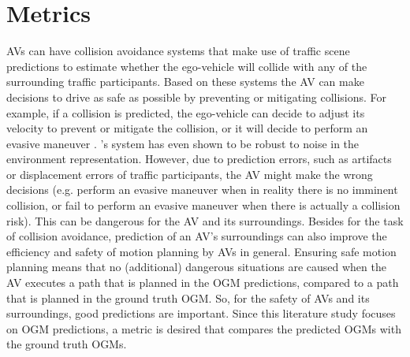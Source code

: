 

\newpage

\section{Metrics} \label{sec:metrics}

\glspl{AV} can have collision avoidance systems that make use of traffic scene predictions to estimate whether the ego-vehicle will collide with any of the surrounding traffic participants. Based on these systems the \gls{AV} can make decisions to drive as safe as possible by preventing or mitigating collisions. For example, if a collision is predicted, the ego-vehicle can decide to adjust its velocity to prevent or mitigate the collision, or it will decide to perform an evasive maneuver \cite{annell2016probabilistic} \cite{wang2019crash}. \cite{annell2016probabilistic}'s system has even shown to be robust to noise in the environment representation. However, due to prediction errors, such as artifacts or displacement errors of traffic participants, the \gls{AV} might make the wrong decisions (e.g. perform an evasive maneuver when in reality there is no imminent collision, or fail to perform an evasive maneuver when there is actually a collision risk). This can be dangerous for the \gls{AV} and its surroundings. Besides for the task of collision avoidance, prediction of an \gls{AV}'s surroundings can also improve the efficiency and safety of motion planning by \glspl{AV} in general. Ensuring safe motion planning means that no (additional) dangerous situations are caused when the \gls{AV} executes a path that is planned in the \gls{OGM} predictions, compared to a path that is planned in the ground truth \gls{OGM}. So, for the safety of \glspl{AV} and its surroundings, good predictions are important. Since this literature study focuses on \gls{OGM} predictions, a metric is desired that compares the predicted \glspl{OGM} with the ground truth \glspl{OGM}. \\

